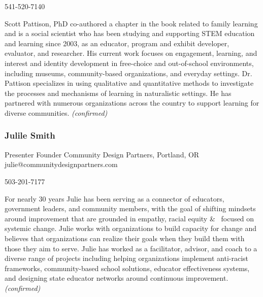 \documentclass{report}
\begin{document}
                541-520-7140\newline

                Scott Pattison, PhD co-authored a chapter in the book related to family learning  and is a social scientist who has been studying and supporting STEM education and learning since 2003, as an educator, program and exhibit developer, evaluator, and researcher. His current work focuses on engagement, learning, and interest and identity development in free-choice and out-of-school environments, including museums, community-based organizations, and everyday settings. Dr. Pattison specializes in using qualitative and quantitative methods to investigate the processes and mechanisms of learning in naturalistic settings. He has partnered with numerous organizations across the country to support learning for diverse communities.
                \emph{ (confirmed) }
              

              
                \subsubsection*{ Julile Smith }
                Presenter\newline
                Founder\newline
                Community Design Partners, Portland, OR
                \newline
                julie@communitydesignpartners.com\newline
                
                503-201-7177\newline

                For nearly 30 years Julie has been serving as a connector of educators, government leaders, and community members, with the goal of shifting mindsets around improvement that are grounded in empathy, racial equity \&  focused on systemic change. Julie works with organizations to build capacity for change and believes that organizations can realize their goals when they build them with those they aim to serve. Julie has worked as a facilitator, advisor, and coach to a diverse range of projects including helping organizations implement anti-racist frameworks, community-based school solutions, educator effectiveness systems, and designing state educator networks around continuous improvement.
                \emph{ (confirmed) }
              
\end{document}
